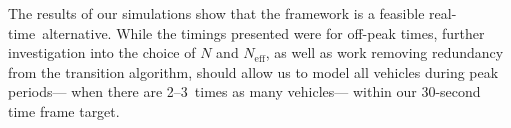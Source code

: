 \documentclass[times, doublespace]{anzsauth}
\newcommand{\rt}{real-time\ }
\begin{document}
The results of our simulations show that the framework is a
feasible \rt alternative.
While the timings presented were for off-peak times,
further investigation into the choice of $N$ and $N_\text{eff}$,
as well as work removing redundancy from the transition algorithm,
should allow us to model all vehicles during peak periods---%
when there are 2--3~times as many vehicles---%
within our 30-second time frame target.




\end{document}
